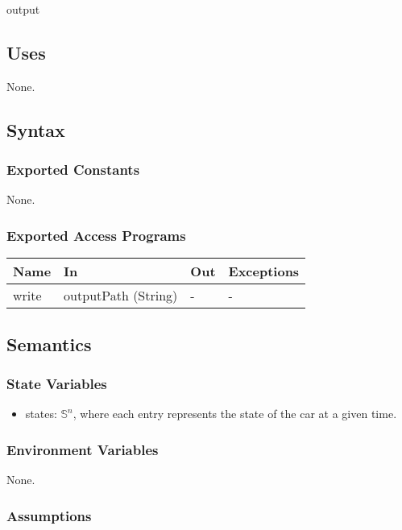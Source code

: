 \documentclass[12pt, titlepage]{article}
\begin{document}
output

\subsection{Uses}
None.

\subsection{Syntax}

\subsubsection{Exported Constants}
None.

\subsubsection{Exported Access Programs}

\begin{center}
\begin{tabular}{p{2cm} p{4cm} p{4cm} p{2cm}}
\hline
\textbf{Name} & \textbf{In} & \textbf{Out} & \textbf{Exceptions} \\
\hline
write & outputPath (String) & - & - \\
\hline
\end{tabular}
\end{center}

\subsection{Semantics}

\subsubsection{State Variables}

\begin{itemize}
  \item states: $\mathbb{S}^n$, where each entry represents the state of the car at a given time.
\end{itemize}

\subsubsection{Environment Variables}

None.

\subsubsection{Assumptions}
\end{document}
